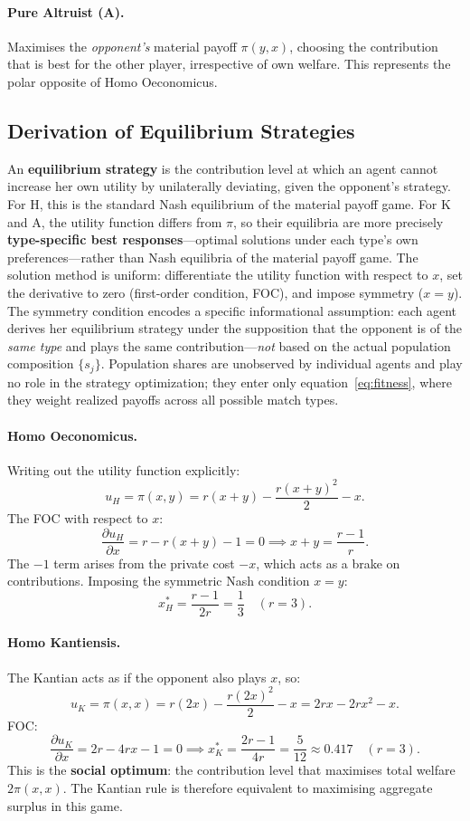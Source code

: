 \documentclass[12pt]{article}
\begin{document}
\paragraph{Pure Altruist (A).} Maximises the \emph{opponent's} material payoff $\pi(y,x)$, choosing the contribution that is best for the other player, irrespective of own welfare. This represents the polar opposite of Homo Oeconomicus.

\subsection{Derivation of Equilibrium Strategies}\label{sub:equilibrium}

An \textbf{equilibrium strategy} is the contribution level at which an agent cannot increase her own utility by unilaterally deviating, given the opponent's strategy. For H, this is the standard Nash equilibrium of the material payoff game. For K and A, the utility function differs from $\pi$, so their equilibria are more precisely \textbf{type-specific best responses}---optimal solutions under each type's own preferences---rather than Nash equilibria of the material payoff game. The solution method is uniform: differentiate the utility function with respect to $x$, set the derivative to zero (first-order condition, FOC), and impose symmetry ($x = y$). The symmetry condition encodes a specific informational assumption: each agent derives her equilibrium strategy under the supposition that the opponent is of the \emph{same type} and plays the same contribution---\emph{not} based on the actual population composition $\{s_j\}$. Population shares are unobserved by individual agents and play no role in the strategy optimization; they enter only equation~\eqref{eq:fitness}, where they weight realized payoffs across all possible match types.

\paragraph{Homo Oeconomicus.}
Writing out the utility function explicitly:
$$u_H = \pi(x,y) = r(x+y) - \frac{r(x+y)^2}{2} - x.$$
The FOC with respect to $x$:
$$\frac{\partial u_H}{\partial x} = r - r(x+y) - 1 = 0 \implies x + y = \frac{r-1}{r}.$$
The $-1$ term arises from the private cost $-x$, which acts as a brake on contributions. Imposing the symmetric Nash condition $x = y$:
$$x_H^* = \frac{r-1}{2r} = \frac{1}{3} \quad (r=3).$$

\paragraph{Homo Kantiensis.}
The Kantian acts as if the opponent also plays $x$, so:
$$u_K = \pi(x,x) = r(2x) - \frac{r(2x)^2}{2} - x = 2rx - 2rx^2 - x.$$
FOC:
$$\frac{\partial u_K}{\partial x} = 2r - 4rx - 1 = 0 \implies x_K^* = \frac{2r-1}{4r} = \frac{5}{12} \approx 0.417 \quad (r=3).$$
This is the \textbf{social optimum}: the contribution level that maximises total welfare $2\pi(x,x)$. The Kantian rule is therefore equivalent to maximising aggregate surplus in this game.
\end{document}
